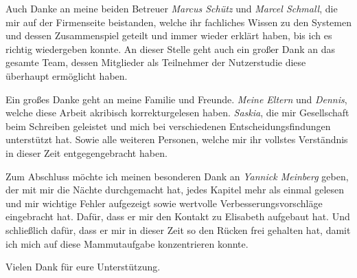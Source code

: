 Auch Danke an meine beiden Betreuer \textit{Marcus Schütz} und \textit{Marcel Schmall}, die mir auf der Firmenseite beistanden, welche ihr fachliches Wissen zu den Systemen und dessen Zusammenspiel geteilt und immer wieder erklärt haben, bis ich es richtig wiedergeben konnte. An dieser Stelle geht auch ein großer Dank an das gesamte Team, dessen Mitglieder als Teilnehmer der Nutzerstudie diese überhaupt ermöglicht haben.

Ein großes Danke geht an meine Familie und Freunde.
\textit{Meine Eltern} und \textit{Dennis}, welche diese Arbeit akribisch korrekturgelesen haben.
\textit{Saskia}, die mir Gesellschaft beim Schreiben geleistet und mich bei verschiedenen Entscheidungsfindungen unterstützt hat.
Sowie alle weiteren Personen, welche mir ihr vollstes Verständnis in dieser Zeit entgegengebracht haben.

Zum Abschluss möchte ich meinen besonderen Dank an \textit{Yannick Meinberg} geben, der mit mir die Nächte durchgemacht hat, jedes Kapitel mehr als einmal gelesen und mir wichtige Fehler aufgezeigt sowie wertvolle Verbesserungsvorschläge eingebracht hat. Dafür, dass er mir den Kontakt zu Elisabeth aufgebaut hat. Und schließlich dafür, dass er mir in dieser Zeit so den Rücken frei gehalten hat, damit ich mich auf diese Mammutaufgabe konzentrieren konnte.

\bigskip

\begin{center}
    Vielen Dank für eure Unterstützung.
\end{center}




\bigskip



